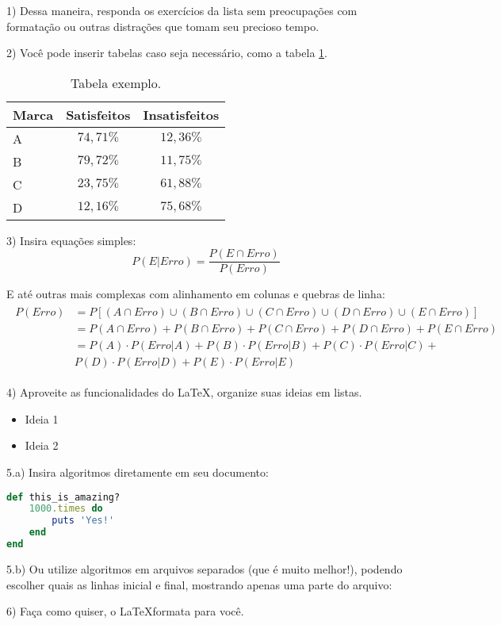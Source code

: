 \documentclass[12pt,a4paper,oneside]{abntex2}
\begin{document}
	\textual
	\pagestyle{cabidaluno} %

1) Dessa maneira, responda os exercícios da lista sem preocupações com formatação ou outras distrações que tomam seu precioso tempo.

2) Você pode inserir tabelas caso seja necessário, como a tabela \ref{tab:exemplo}.

\begin{table}[htb]
	\center
	\begin{tabular}{|l|c|c|}
		\hline
		\textbf{Marca} & \textbf{Satisfeitos} & \textbf{Insatisfeitos} \\ \hline
		A & $74,71\%$ & $12,36\%$ \\ \hline
		B & $79,72\%$ & $11,75\%$ \\ \hline
		C & $23,75\%$ & $61,88\%$ \\ \hline
		D & $12,16\%$ & $75,68\%$ \\ \hline
	\end{tabular}
	\caption{Tabela exemplo.}
	\label{tab:exemplo}
\end{table}

3) Insira equações simples:
\[
	P(E|Erro) = \frac{P(E \cap Erro)}{P(Erro)}
\]

E até outras mais complexas com alinhamento em colunas e quebras de linha:
\begin{align*}
	\begin{split}
		P(Erro) &= P[(A \cap Erro) \cup (B \cap Erro) \cup (C \cap Erro) \cup (D \cap Erro) \cup (E \cap Erro)] \\
		& = P(A \cap Erro) + P(B \cap Erro) + P(C \cap Erro) + P(D \cap Erro) + P(E \cap Erro) \\
		& = P(A) \cdot P(Erro|A) + P(B) \cdot P(Erro|B) + P(C) \cdot P(Erro|C) + \\
		& P(D) \cdot P(Erro|D) + P(E) \cdot P(Erro|E)
	\end{split}
\end{align*}

4) Aproveite as funcionalidades do \LaTeX, organize suas ideias em listas.
\begin{itemize}
	\item Ideia 1
	\item Ideia 2
\end{itemize}

5.a) Insira algoritmos diretamente em seu documento:
\begin{lstlisting}[language = Ruby, caption = Algoritmo inline]
def this_is_amazing?
	1000.times do
		puts 'Yes!'
	end
end
\end{lstlisting}

5.b) Ou utilize algoritmos em arquivos separados (que é muito melhor!), podendo escolher quais as linhas inicial e final, mostrando apenas uma parte do arquivo:


6) Faça como quiser, o \LaTeX formata para você.
\end{document}
